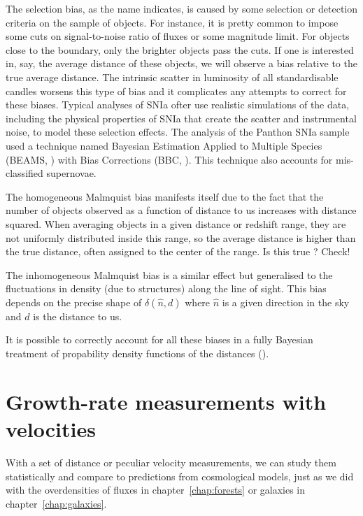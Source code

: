 The selection bias, as the name indicates, is caused by some selection or detection criteria 
on the sample of objects. For instance, it is pretty common to impose some cuts on signal-to-noise 
ratio of fluxes or some magnitude limit. For objects close to the boundary, only 
the brighter objects pass the cuts. If one is interested in, say, the average distance of these objects, 
we will observe a bias relative to the true average distance. 
The intrinsic scatter in luminosity of all standardisable candles worsens this type of bias 
and it complicates any attempts to correct for these biases. 
Typical analyses of SNIa ofter use realistic simulations of the data, including the physical 
properties of SNIa that create the scatter and instrumental noise, to model these selection effects. 
The analysis of the Panthon SNIa sample used a technique named 
Bayesian Estimation Applied to Multiple Species (BEAMS, \cite{kunzBayesianEstimationApplied2007}) 
with Bias Corrections 
(BBC, \cite{kesslerCorrectingTypeIa2017}). This technique also accounts for mis-classified supernovae. 

The homogeneous Malmquist bias manifests itself due to the fact that the number of objects 
observed as a function of distance to us increases with distance squared. When averaging 
objects in a given distance or redshift range, they are not uniformly distributed inside this range,
so the average distance is higher than the true distance, often assigned to the center of the range. 
Is this true ? Check! 
 
The inhomogeneous Malmquist bias is a similar effect but generalised to the fluctuations in density 
(due to structures) along the line of sight. This bias depends on the precise shape of $\delta(\hat{n}, d)$
where $\hat{n}$ is a given direction in the sky and $d$ is the distance to us. 

It is possible to correctly account for all these biases in a fully Bayesian treatment of  
propability density functions of the distances 
(\cite{grazianiPeculiarVelocityField2019, boruahReconstructingDarkMatter2021}). 

\section{Growth-rate measurements with velocities}
\label{velocities:methods}


With a set of distance or peculiar velocity measurements, 
we can study them statistically and compare to predictions from 
cosmological models, just as we did with the overdensities of fluxes 
in chapter~\ref{chap:forests} or galaxies in chapter~\ref{chap:galaxies}. 

